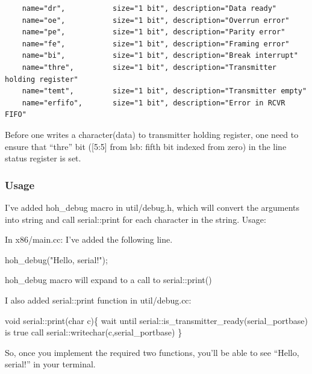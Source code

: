 \documentclass[]{book}
\newenvironment{Shaded}{}{}
\newcommand{\DataTypeTok}[1]{\textcolor[rgb]{0.50,0.00,0.00}{{#1}}}
\newcommand{\StringTok}[1]{\textcolor[rgb]{0.87,0.00,0.00}{{#1}}}
\newcommand{\NormalTok}[1]{{#1}}
\begin{document}
\begin{verbatim}
    name="dr",           size="1 bit", description="Data ready"
    name="oe",           size="1 bit", description="Overrun error"
    name="pe",           size="1 bit", description="Parity error"
    name="fe",           size="1 bit", description="Framing error"
    name="bi",           size="1 bit", description="Break interrupt"
    name="thre",         size="1 bit", description="Transmitter holding register"
    name="temt",         size="1 bit", description="Transmitter empty"
    name="erfifo",       size="1 bit", description="Error in RCVR FIFO"
\end{verbatim}

Before one writes a character(data) to transmitter holding register, one
need to ensure that ``thre'' bit ({[}5:5{]} from lsb: fifth bit indexed
from zero) in the line status register is set.

\subsubsection*{Usage}\label{usage-1}

I've added hoh\_debug macro in util/debug.h, which will convert the
arguments into string and call serial::print for each character in the
string. Usage:

In x86/main.cc: I've added the following line.

\begin{Shaded}
\begin{Highlighting}[]
    \NormalTok{hoh_debug(}\StringTok{"Hello, serial!"}\NormalTok{);}
\end{Highlighting}
\end{Shaded}

hoh\_debug macro will expand to a call to serial::print()

I also added serial::print function in util/debug.cc:

\begin{Shaded}
\begin{Highlighting}[]
    \DataTypeTok{void} \NormalTok{serial::print(}\DataTypeTok{char} \NormalTok{c)\{}
       \NormalTok{wait until serial::is_transmitter_ready(serial_portbase) is true}
       \NormalTok{call serial::writechar(c,serial_portbase)}
    \NormalTok{\}}
\end{Highlighting}
\end{Shaded}

So, once you implement the required two functions, you'll be able to see
``Hello, serial!'' in your terminal.
\end{document}
